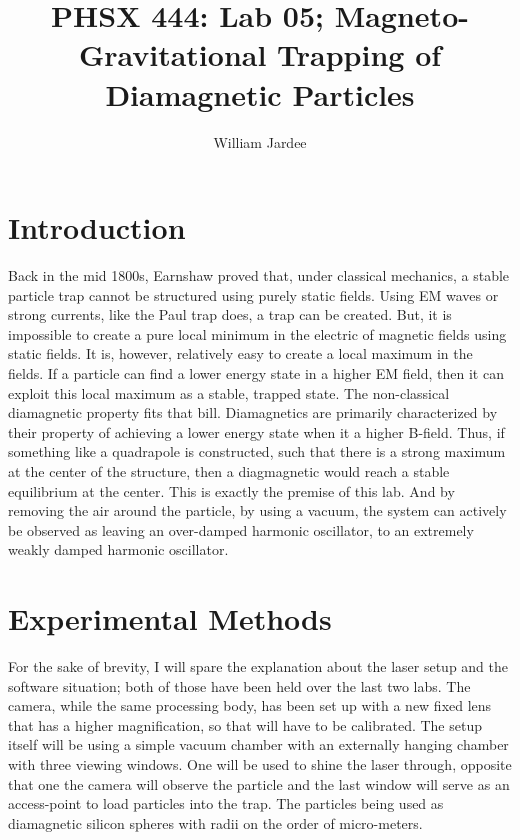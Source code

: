 \documentclass[12pt]{article}
\begin{document}
\title{PHSX 444: Lab 05; Magneto-Gravitational Trapping of Diamagnetic Particles}
\author{William Jardee}
\maketitle


\section{Introduction}

Back in the mid 1800s, Earnshaw proved that, under classical mechanics, a stable particle trap cannot be structured using purely static fields. Using EM waves or strong currents, like the Paul trap does, a trap can be created. But, it is impossible to create a pure local minimum in the electric of magnetic fields using static fields. It is, however, relatively easy to create a local maximum in the fields. If a particle can find a lower energy state in a higher EM field, then it can exploit this local maximum as a stable, trapped state. The non-classical diamagnetic property fits that bill. Diamagnetics are primarily characterized by their property of achieving a lower energy state when it a higher B-field. Thus, if something like a quadrapole is constructed, such that there is a strong maximum at the center of the structure, then a diagmagnetic would reach a stable equilibrium at the center. This is exactly the premise of this lab. And by removing the air around the particle, by using a vacuum, the system can actively be observed as leaving an over-damped harmonic oscillator, to an extremely weakly damped harmonic oscillator. 




\section{Experimental Methods}
For the sake of brevity, I will spare the explanation about the laser setup and the software situation; both of those have been held over the last two labs. The camera, while the same processing body, has been set up with a new fixed lens that has a higher magnification, so that will have to be calibrated. The setup itself will be using a simple vacuum chamber with an externally hanging chamber with three viewing windows. One will be used to shine the laser through, opposite that one the camera will observe the particle and the last window will serve as an access-point to load particles into the trap. The particles being used as diamagnetic silicon spheres with radii on the order of micro-meters. 
\end{document}
